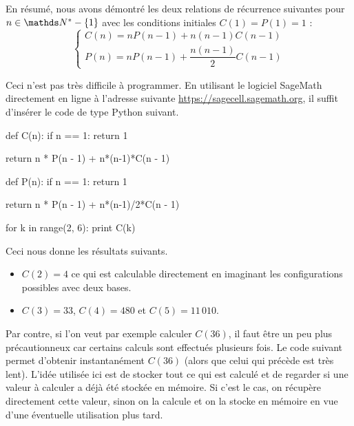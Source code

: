 En résumé, nous avons démontré les deux relations de récurrence suivantes pour $n \in \NN^* - \{1\}$ avec les conditions initiales $C(1) = P(1) = 1$ :
\begin{equation}
	\begin{cases}
		C(n) = n P(n - 1) + n(n-1) C(n-1) \\
		P(n) = n P(n - 1) + \dfrac{n(n-1)}{2} C(n - 1)
	\end{cases}
\end{equation}


\medskip

Ceci n'est pas très difficile à programmer. En utilisant le logiciel SageMath directement en ligne à l'adresse suivante \url{https://sagecell.sagemath.org}, il suffit d'insérer le code de type Python suivant.


\bigskip

\begin{myverb}
def C(n):
    if n == 1:
        return 1
        
    return n * P(n - 1) + n*(n-1)*C(n - 1)

def P(n):
    if n == 1:
        return 1
        
    return n * P(n - 1) + n*(n-1)/2*C(n - 1)
        
for k in range(2, 6):
    print C(k)

\end{myverb}

\bigskip

Ceci nous donne les résultats suivants.

\medskip

\begin{itemize}
    \item[\textbullet] $C(2) = 4$ ce qui est calculable directement en imaginant les configurations possibles avec deux bases.

    \medskip

    \item[\textbullet] $C(3) = 33$,
                       $C(4) = 480$ et
                       $C(5) = 11\,010$.
\end{itemize}


\medskip

Par contre, si l'on veut par exemple calculer $C(36)$, il faut être un peu plus précautionneux car certains calculs sont effectués plusieurs fois. Le code suivant permet d'obtenir instantanément $C(36)$ (alors que celui qui précède est très lent). L'idée utilisée ici est de stocker tout ce qui est calculé et de regarder si une valeur à calculer a déjà été stockée en mémoire. Si c'est le cas, on récupère directement cette valeur, sinon on la calcule et on la stocke en mémoire en vue d'une éventuelle utilisation plus tard.

